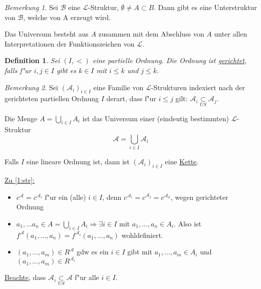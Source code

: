 \documentclass[a4paper,12pt,numbers=noenddot,parskip=full]{scrartcl}
\newcommand{\scrL}{\mathcal{L}}
\newcommand{\scrA}{\mathcal{A}}
\newcommand{\scrB}{\mathcal{B}}
\theoremstyle{dotless}
\newtheorem{definition}[theorem]{Definition}
\theoremstyle{remark}
\newtheorem*{remark}{Bemerkung}
\begin{document}
\begin{remark}
	Sei $\scrB$ eine $\scrL$-Struktur, $\emptyset \ne A \subset B$. Dann gibt es eine Unterstruktur von $\scrB$, welche von A erzeugt wird.
	
	Das Universum besteht aus $A$ zusammen mit dem Abschluss von $A$ unter allen Interpretationen der Funktionszeichen von $\scrL$.
\end{remark}

\begin{definition}
	Sei $(I, <)$ eine partielle Ordnung. Die Ordnung ist \underline{gerichtet}, falls f"ur $i, j \in I$ gibt es $k \in I$ mit $i \leq k$ und $j \leq k$.
\end{definition}

\begin{remark}
	Sei $(\scrA_i)_{i \in I}$ eine Familie von $\scrL$-Strukturen indexiert nach der gerichteten partiellen Ordnung $I$ derart, dass f"ur $i \leq j$ gilt: $\scrA_i \underset{US}{\subset} \scrA_j$.
	
	Die Menge $A=\underset{i \in I}{\bigcup} A_i$ ist das Universum einer (eindeutig bestimmten) $\scrL$-Struktur
	\begin{equation}
		\scrA = \underset{i \in I}{\bigcup} \scrA_i \label{1:str}
	\end{equation}
	
	Falls $I$ eine lineare Ordnung ist, dann ist $(\scrA_i)_{i \in I}$ eine \underline{Kette}.
	
	\underline{Zu \ref{1:str}:} \begin{itemize}
		\item $c^\scrA=c^{\scrA_i}$ f"ur ein (alle) $i \in I$, denn $c^{\scrA_i}=c^{\scrA_j}=c^{\scrA_k}$, {wegen gerichteter Ordnung}
		\item $a_1, \dots a_n \in A = \underset{i \in I}{\bigcup} A_i \Longrightarrow \exists i \in I$ mit $a_1, \dots, a_n \in A_i$.
		Also ist $f^\scrA (a_1, \dots, a_n) = f^{\scrA_i} (a_1, \dots, a_n)$ wohldefiniert.
		\item $(a_1, \dots, a_m) \in R^\scrA$ gdw es ein $i \in I$ gibt mit $a_1, \dots, a_m \in A_i$ und $(a_1, \dots, a_m) \in R^{\scrA_i}$
	\end{itemize}

	\underline{Beachte}, dass $\scrA_i \underset{US}{\subset} \scrA$ f"ur alle $i \in I$.
\end{remark}
\end{document}
